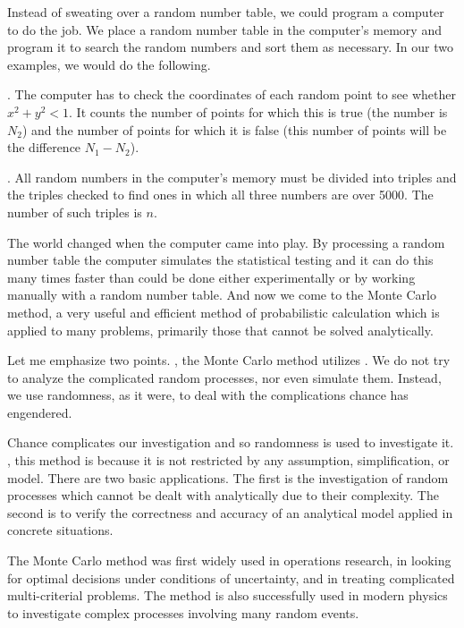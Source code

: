  Instead of sweating over a random
number table, we could program a computer to do the job. We place
a random number table in the computer's memory and program it to
search the random numbers and sort them as necessary. In our two
examples, we would do the following.

. The computer has to check the coordinates of each
random point to see whether $x^{2} + y^{2} < 1$. It counts the number of points
for which this is true (the number is $N_{2}$) and the number of points for
which it is false (this number of points will be the difference $N_{1} - N_{2}$).

. All random numbers in the computer's memory must
be divided into triples and the triples checked to find ones in which all three numbers are over 5000. The number of such triples is $n$.

 The world changed when the computer
came into play. By processing a random number table the computer
simulates the statistical testing and it can do this many times faster than
could be done either experimentally or by working manually with
a random number table. And now we come to the Monte Carlo method,
a very useful and efficient method of probabilistic calculation which is
applied to many problems, primarily those that cannot be solved
analytically.

Let me emphasize two points. , the Monte Carlo method
utilizes . We do not try to analyze the complicated random processes, nor even simulate them. Instead, we use randomness, as it were, to deal with the complications chance has engendered.

Chance complicates our investigation and so randomness is used to
investigate it. , this method is  because it is not restricted by any assumption, simplification, or model. There are two
basic applications. The first is the investigation of random processes
which cannot be dealt with analytically due to their complexity. The
second is to verify the correctness and accuracy of an analytical model
applied in concrete situations.

The Monte Carlo method was first widely used in operations research,
in looking for optimal decisions under conditions of uncertainty, and in
treating complicated multi-criterial problems. The method is also successfully
used in modern physics to investigate complex processes involving
many random events.


